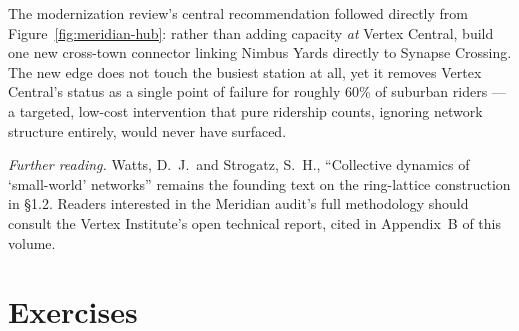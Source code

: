 \documentclass{tufte-book}
\begin{document}
\begin{marginfigure}
\centering
{}
\caption{Vertex Central (VC) as articulation point: remove it and the Nimbus Yards
cluster (N1--N3) disconnects entirely from the rest of the map.}
\label{fig:meridian-hub}
\end{marginfigure}

The modernization review's central recommendation followed directly from
Figure~\ref{fig:meridian-hub}: rather than adding capacity \emph{at} Vertex Central,
build one new cross-town connector linking Nimbus Yards directly to Synapse
Crossing. The new edge does not touch the busiest station at all, yet it removes
Vertex Central's status as a single point of failure for roughly 60\% of
suburban riders --- a targeted, low-cost intervention that pure ridership counts,
ignoring network structure entirely, would never have surfaced.

\begin{fullwidth}
\small
\textit{Further reading.} Watts, D.\ J.\ and Strogatz, S.\ H., ``Collective dynamics
of `small-world' networks'' remains the founding text on the ring-lattice
construction in \S1.2. Readers interested in the Meridian audit's full methodology
should consult the Vertex Institute's open technical report, cited in
Appendix~B of this volume.
\end{fullwidth}

\section*{Exercises}
\end{document}
